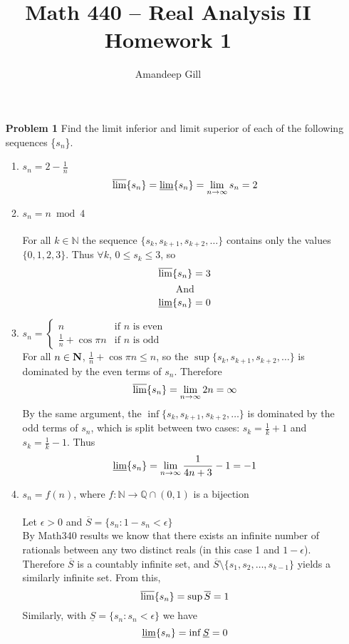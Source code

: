 \documentclass[a4paper,12pt]{report}
\begin{document}
\title{Math 440 -- Real Analysis II \\ \vspace{7px} \large{Homework 1}}
\author{Amandeep Gill}
\maketitle

\begin{enumerate}

\item[\bf{Problem 1}] Find the limit inferior and limit superior of each of the following sequences \{$s_n$\}. 
	\begin{enumerate}
	\item{$s_n = 2 - \frac{1}{n}$} \\
		\[\varlimsup \{s_n\} = \varliminf \{s_n\} = \lim\limits_{n \to \infty}{s_n} = 2\]

	\item{$s_n = n \bmod{4}$} \\\\
		For all $k \in \mathbb{N}$ the sequence $\{s_k, s_{k+1}, s_{k+2}, \ldots\}$ contains only the values $\{0, 1, 2, 3\}$. Thus $\forall{k}$, $0 \leqslant s_k \leqslant 3$, so
		\[\varlimsup \{s_n\} = 3 \]
		\[\text{And}\]
		\[\varliminf \{s_n\} = 0 \] 

	\item{$s_n = \begin{cases}
		n & \text{if $n$ is even} \\
		\frac{1}{n} + \cos{\pi n} & \text{if $n$ is odd}
		\end{cases}$} \\
			
		For all $n \in \bf{N}$, $\frac{1}{n} + \cos{\pi n} \leq n$, so the $\sup\{s_k, s_{k+1}, s_{k+2}, \ldots\}$ is dominated by the even terms of $s_n$. Therefore
		\[\varlimsup \{s_n\} = \lim\limits_{n \to \infty}{2n} = \infty\]
		By the same argument, the $\inf\{s_k, s_{k+1}, s_{k+2}, \ldots\}$ is dominated by the odd terms of $s_n$, which is split between two cases: $s_k = \frac{1}{k} + 1$ and $s_k = \frac{1}{k} - 1$. Thus
		\[
			\varliminf \{s_n\} = 
			\lim\limits_{n\to\infty}{\frac{1}{4n+3}-1}
			= -1
		\]
	
	\item{$s_n = f(n)$, where $f \colon \mathbb{N} \to \mathbb{Q} \cap (0,1)$
		is a bijection}	\\\\
		Let $\epsilon > 0$ and $\overline{S} = \{s_n \colon 1 - s_n < \epsilon\}$ \\
		By Math340 results we know that there exists an infinite number of rationals between any two distinct reals (in this case 1 and $1 - \epsilon$). Therefore $\overline{S}$ is a countably infinite set, and $\overline{S} \setminus \{s_1, s_2, \ldots, s_{k-1}\}$ yields a similarly infinite set. From this,
		\[\varlimsup \{s_n\} = \sup{\overline{S}} = 1\]
		Similarly, with $\underline{S} = \{s_n \colon s_n < \epsilon\}$ we have 
		\[\varliminf \{s_n\} = \inf{\underline{S}} = 0\]
		

\end{enumerate}
\end{enumerate}
\end{document}
